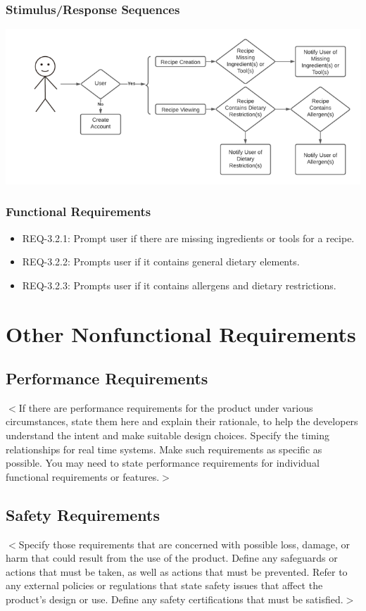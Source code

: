 \documentclass{scrreprt}
\begin{document}
\subsection{Stimulus/Response Sequences}

\includegraphics{FlowCharts/Search-Flags.png}

\subsection{Functional Requirements}

\begin{itemize}
    \item REQ-3.2.1: Prompt user if there are missing ingredients or tools for a recipe.
    \item REQ-3.2.2: Prompts user if it contains general dietary elements.
    \item REQ-3.2.3: Prompts user if it contains allergens and dietary restrictions.    
\end{itemize}

\chapter{Other Nonfunctional Requirements}

\section{Performance Requirements}
$<$If there are performance requirements for the product under various 
circumstances, state them here and explain their rationale, to help the 
developers understand the intent and make suitable design choices. Specify the 
timing relationships for real time systems. Make such requirements as specific 
as possible. You may need to state performance requirements for individual 
functional requirements or features.$>$

\section{Safety Requirements}
$<$Specify those requirements that are concerned with possible loss, damage, or 
harm that could result from the use of the product. Define any safeguards or 
actions that must be taken, as well as actions that must be prevented. Refer to 
any external policies or regulations that state safety issues that affect the 
product’s design or use. Define any safety certifications that must be 
satisfied.$>$
\end{document}
